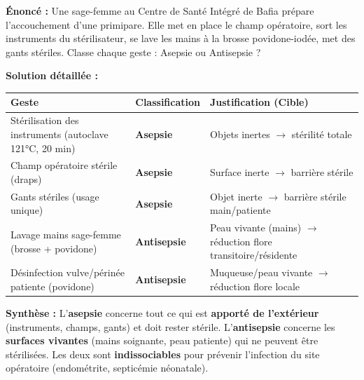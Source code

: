 \documentclass[11pt]{article}
\begin{document}
\begin{exoresolu}
\textbf{Énoncé :} Une sage-femme au Centre de Santé Intégré de Bafia prépare l'accouchement d'une primipare. Elle met en place le champ opératoire, sort les instruments du stérilisateur, se lave les mains à la brosse povidone-iodée, met des gants stériles. Classe chaque geste : Asepsie ou Antisepsie ?

\textbf{Solution détaillée :}
\begin{center}
\begin{tabularx}{\linewidth}{|l|X|l|}
\hline
\rowcolor{popgreenL}
\textbf{Geste} & \textbf{Classification} & \textbf{Justification (Cible)} \\
\hline
Stérilisation des instruments (autoclave 121°C, 20 min) & \textbf{Asepsie} & Objets inertes $\rightarrow$ stérilité totale \\
Champ opératoire stérile (draps) & \textbf{Asepsie} & Surface inerte $\rightarrow$ barrière stérile \\
Gants stériles (usage unique) & \textbf{Asepsie} & Objet inerte $\rightarrow$ barrière stérile main/patiente \\
Lavage mains sage-femme (brosse + povidone) & \textbf{Antisepsie} & Peau vivante (mains) $\rightarrow$ réduction flore transitoire/résidente \\
Désinfection vulve/périnée patiente (povidone) & \textbf{Antisepsie} & Muqueuse/peau vivante $\rightarrow$ réduction flore locale \\
\hline
\end{tabularx}
\end{center}
\textbf{Synthèse :} L'\textbf{asepsie} concerne tout ce qui est \textbf{apporté de l'extérieur} (instruments, champs, gants) et doit rester stérile. L'\textbf{antisepsie} concerne les \textbf{surfaces vivantes} (mains soignante, peau patiente) qui ne peuvent être stérilisées. Les deux sont \textbf{indissociables} pour prévenir l'infection du site opératoire (endométrite, septicémie néonatale).
\end{exoresolu}
\end{document}
